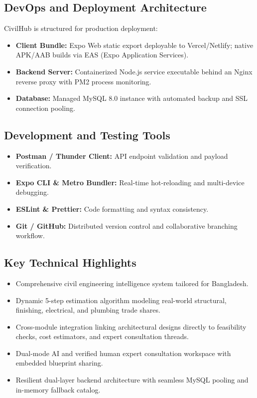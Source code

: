 \documentclass[12pt,a4paper]{article}
\begin{document}
\subsection{DevOps and Deployment Architecture}
CivilHub is structured for production deployment:
\begin{itemize}
    \item \textbf{Client Bundle:} Expo Web static export deployable to Vercel/Netlify; native APK/AAB builds via EAS (Expo Application Services).
    \item \textbf{Backend Server:} Containerized Node.js service executable behind an Nginx reverse proxy with PM2 process monitoring.
    \item \textbf{Database:} Managed MySQL 8.0 instance with automated backup and SSL connection pooling.
\end{itemize}

\subsection{Development and Testing Tools}
\begin{itemize}
    \item \textbf{Postman / Thunder Client:} API endpoint validation and payload verification.
    \item \textbf{Expo CLI \& Metro Bundler:} Real-time hot-reloading and multi-device debugging.
    \item \textbf{ESLint \& Prettier:} Code formatting and syntax consistency.
    \item \textbf{Git / GitHub:} Distributed version control and collaborative branching workflow.
\end{itemize}

\subsection{Key Technical Highlights}
\begin{itemize}
    \item Comprehensive civil engineering intelligence system tailored for Bangladesh.
    \item Dynamic 5-step estimation algorithm modeling real-world structural, finishing, electrical, and plumbing trade shares.
    \item Cross-module integration linking architectural designs directly to feasibility checks, cost estimators, and expert consultation threads.
    \item Dual-mode AI and verified human expert consultation workspace with embedded blueprint sharing.
    \item Resilient dual-layer backend architecture with seamless MySQL pooling and in-memory fallback catalog.
\end{itemize}
\end{document}

